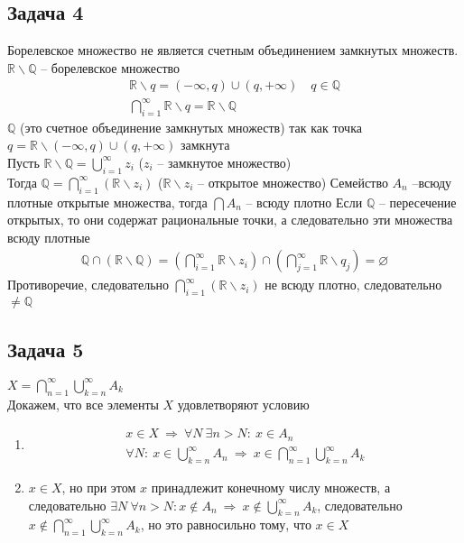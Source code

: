 \subsection*{Задача 4}
	Борелевское множество не является счетным объединением замкнутых множеств.\\
	$\mathbb{R} \backslash \mathbb{Q}$ -- борелевское множество
	\begin{gather*}
	\mathbb{R} \backslash q = (-\infty, q) \cup (q,+\infty)\quad q \in \mathbb{Q}\\
	\bigcap\limits_{i=1}^{\infty} \mathbb{R} \backslash q = \mathbb{R} \backslash \mathbb{Q}
	\end{gather*}
	$\mathbb{Q}$ (это счетное объединение замкнутых множеств) так как точка $q = \mathbb{R} \backslash (-\infty, q) \cup (q, +\infty)$ замкнута\\
	Пусть $\mathbb{R} \backslash \mathbb{Q} = \bigcup\limits_{i=1}^{\infty} z_i$ ($z_i$ -- замкнутое множество)\\
	Тогда $\mathbb{Q} = \bigcap\limits_{i=1}^{\infty} (\mathbb{R} \backslash z_i)$ ($\mathbb{R} \backslash z_i$ -- открытое множество)
	\vskip 0.1in
	 Семейство $A_n$ --всюду плотные открытые множества, тогда $\bigcap A_n$ -- всюду плотно
	\vskip 0.1in
	Если $\mathbb{Q}$ -- пересечение открытых, то они содержат рациональные точки, а следовательно эти множества всюду плотные
	\begin{gather*}
	\mathbb{Q} \cap (\mathbb{R} \backslash \mathbb{Q}) = \left(\bigcap\limits_{i=1}^{\infty} \mathbb{R} \backslash z_i \right) \cap \left(\bigcap\limits_{j=1}^{\infty} \mathbb{R} \backslash q_j\right) = \varnothing
	\end{gather*}
	Противоречие, следовательно $\bigcap\limits_{i=1}^{\infty} (\mathbb{R} \backslash z_i)$ не всюду плотно, следовательно $\ne \mathbb{Q}$


\subsection*{Задача 5}
	$X = \bigcap\limits_{n=1}^{\infty} \bigcup\limits_{k=n}^{\infty} A_k$\\
	Докажем, что все элементы $X$ удовлетворяют условию
	\begin{enumerate}
	\item \begin{gather*}
		x \in X\ \Rightarrow\ \forall N\ \exists n > N:\ x \in A_n\\
		\forall N:\ x \in \bigcup\limits_{k=n}^{\infty} A_n\ \Rightarrow\ x \in \bigcap\limits_{n=1}^{\infty} \bigcup\limits_{k=n}^{\infty} A_k
	\end{gather*}
	\item
		$x \in X$, но при этом $x$ принадлежит конечному числу множеств, а следовательно $\exists N\ \forall n > N: x \notin A_n\ \Rightarrow\ x \notin \bigcup\limits_{k=n}^{\infty} A_k$, следовательно $x \notin \bigcap\limits_{n=1}^{\infty} \bigcup\limits_{k=n}^{\infty} A_k$, но это равносильно тому, что $x \in X$
	\end{enumerate}


